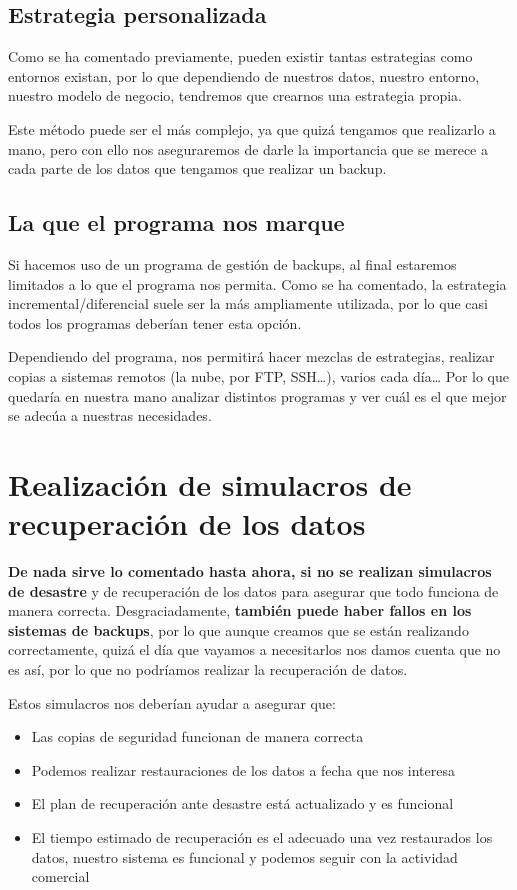 \subsection{Estrategia personalizada}
Como se ha comentado previamente, pueden existir tantas estrategias como entornos existan, por lo que dependiendo de nuestros datos, nuestro entorno, nuestro modelo de negocio, tendremos que crearnos una estrategia propia.

Este método puede ser el más complejo, ya que quizá tengamos que realizarlo a mano, pero con ello nos aseguraremos de darle la importancia que se merece a cada parte de los datos que tengamos que realizar un backup.

\subsection{La que el programa nos marque}
Si hacemos uso de un programa de gestión de backups, al final estaremos limitados a lo que el programa nos permita. Como se ha comentado, la estrategia incremental/diferencial suele ser la más ampliamente utilizada, por lo que casi todos los programas deberían tener esta opción.

Dependiendo del programa, nos permitirá hacer mezclas de estrategias, realizar copias a sistemas remotos (la nube, por FTP, SSH…), varios cada día… Por lo que quedaría en nuestra mano analizar distintos programas y ver cuál es el que mejor se adecúa a nuestras necesidades.

\section{Realización de simulacros de recuperación de los datos}
\textbf{De nada sirve lo comentado hasta ahora, si no se realizan simulacros de desastre} y de recuperación de los datos para asegurar que todo funciona de manera correcta. Desgraciadamente, \textbf{también puede haber fallos en los sistemas de backups}, por lo que aunque creamos que se están realizando correctamente, quizá el día que vayamos a necesitarlos nos damos cuenta que no es así, por lo que no podríamos realizar la recuperación de datos.


Estos simulacros nos deberían ayudar a asegurar que:

\begin{itemize}
    \item Las copias de seguridad funcionan de manera correcta
    \item Podemos realizar restauraciones de los datos a fecha que nos interesa
    \item El plan de recuperación ante desastre está actualizado y es funcional
    \item El tiempo estimado de recuperación es el adecuado
    una vez restaurados los datos, nuestro sistema es funcional y podemos seguir con la actividad comercial
\end{itemize}




\clearpage